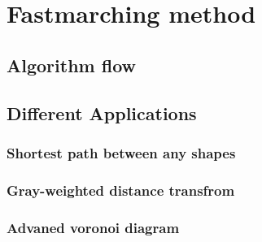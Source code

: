 \chapter{Fastmarching method}
\section{Algorithm flow}
\section{Different Applications}
\subsection{Shortest path between any shapes}
\subsection{Gray-weighted distance transfrom}
\subsection{Advaned voronoi diagram}

